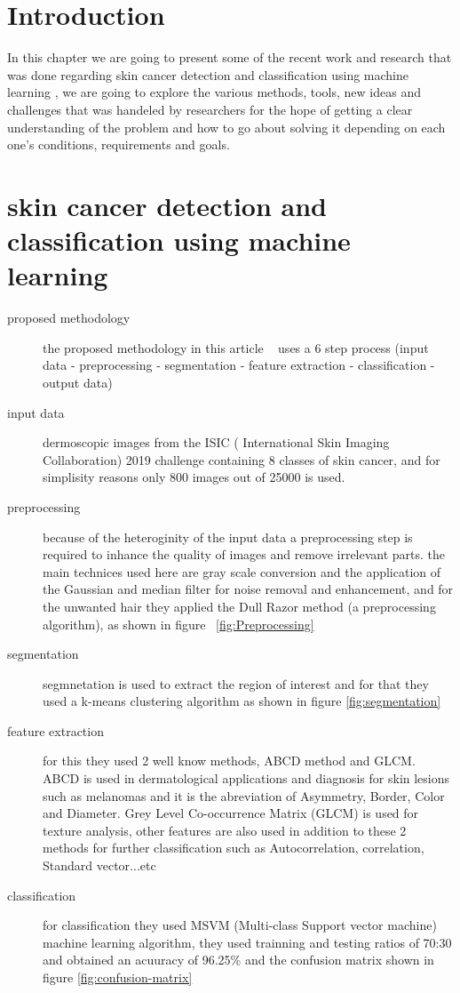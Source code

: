 \section{Introduction}
In this chapter we are going to present some of the recent work and research that was done regarding skin cancer detection and classification using machine learning , we are going to explore the various methods, tools, new ideas and challenges that was handeled by researchers for the hope of getting a clear understanding of the problem and how to go about solving it depending on each one's conditions, requirements and goals.



\section{skin cancer detection and classification using machine learning}
\begin{description}
    \item [proposed methodology]
    the proposed methodology in this article ~\cite{Krishna2020} uses a 6 step process (input data - preprocessing - segmentation - feature extraction - classification - output data)
    \item [input data] 
        dermoscopic images from the ISIC ( International Skin Imaging Collaboration) 2019 challenge containing 8 classes of skin cancer, and for simplisity reasons only 800 images out of 25000 is used.
    
    \item [preprocessing]
        because of the heteroginity of the input data a preprocessing step is required to inhance the quality of images and remove irrelevant parts. the main technices used here are gray scale conversion and the application of the Gaussian and median filter for noise removal and enhancement, and for the unwanted hair they applied the Dull Razor method (a preprocessing algorithm), as shown in figure ~\ref{fig:Preprocessing}

    \item [segmentation]
        segmnetation is used to extract the region of interest and for that they used a k-means clustering algorithm as shown in figure \ref{fig:segmentation}
        
    \item [feature extraction]
        for this they used 2 well know methods, ABCD method and GLCM. ABCD is used in dermatological applications and diagnosis for skin lesions such as melanomas and it is the abreviation of Asymmetry, Border, Color and Diameter. Grey Level Co-occurrence Matrix (GLCM) is used for texture analysis, other features are also used in addition to these 2 methods for further classification such as Autocorrelation, correlation, Standard vector...etc
    
    \item [classification]
        for classification they used MSVM (Multi-class Support vector machine) machine learning algorithm, they used trainning and testing ratios of 70:30 and obtained an acuuracy of 96.25\% and the confusion matrix shown in figure \ref{fig:confusion-matrix}
\end{description}

